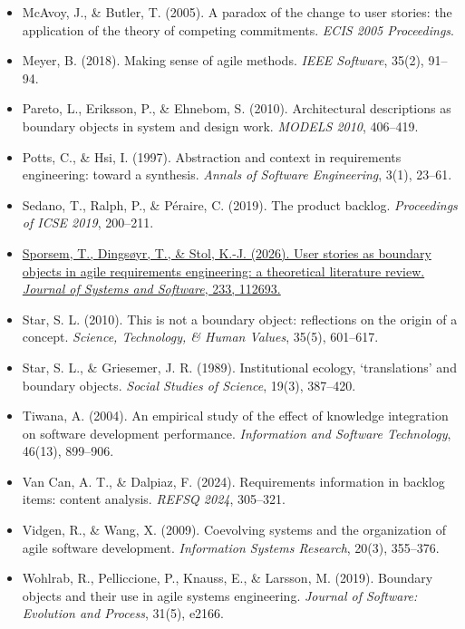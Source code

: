 \documentclass[11pt]{article}
\begin{document}
\begin{itemize}[leftmargin=*]
  \item McAvoy, J., \& Butler, T. (2005). A paradox of the change to user stories: the application of the theory of competing commitments. \emph{ECIS 2005 Proceedings}.
  \item Meyer, B. (2018). Making sense of agile methods. \emph{IEEE Software}, 35(2), 91--94.
  \item Pareto, L., Eriksson, P., \& Ehnebom, S. (2010). Architectural descriptions as boundary objects in system and design work. \emph{MODELS 2010}, 406--419.
  \item Potts, C., \& Hsi, I. (1997). Abstraction and context in requirements engineering: toward a synthesis. \emph{Annals of Software Engineering}, 3(1), 23--61.
  \item Sedano, T., Ralph, P., \& P\'eraire, C. (2019). The product backlog. \emph{Proceedings of ICSE 2019}, 200--211.
  \item \href{https://doi.org/10.1016/j.jss.2025.112693}{Sporsem, T., Dings{\o}yr, T., \& Stol, K.-J. (2026). User stories as boundary objects in agile requirements engineering: a theoretical literature review. \emph{Journal of Systems and Software}, 233, 112693.}
  \item Star, S. L. (2010). This is not a boundary object: reflections on the origin of a concept. \emph{Science, Technology, \& Human Values}, 35(5), 601--617.
  \item Star, S. L., \& Griesemer, J. R. (1989). Institutional ecology, `translations' and boundary objects. \emph{Social Studies of Science}, 19(3), 387--420.
  \item Tiwana, A. (2004). An empirical study of the effect of knowledge integration on software development performance. \emph{Information and Software Technology}, 46(13), 899--906.
  \item Van Can, A. T., \& Dalpiaz, F. (2024). Requirements information in backlog items: content analysis. \emph{REFSQ 2024}, 305--321.
  \item Vidgen, R., \& Wang, X. (2009). Coevolving systems and the organization of agile software development. \emph{Information Systems Research}, 20(3), 355--376.
  \item Wohlrab, R., Pelliccione, P., Knauss, E., \& Larsson, M. (2019). Boundary objects and their use in agile systems engineering. \emph{Journal of Software: Evolution and Process}, 31(5), e2166.
\end{itemize}
\end{document}
